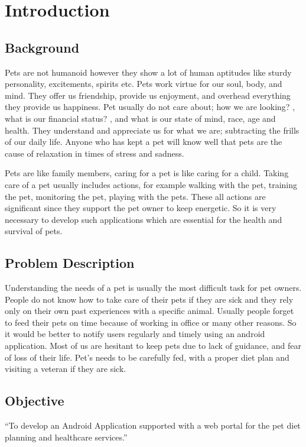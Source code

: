 \chapter{Introduction} \label{chap:intro}


\section{Background}
Pets are not humanoid however they show a lot of human aptitudes like sturdy personality, excitements, spirits etc. Pets work virtue for our soul, body, and mind. They offer us friendship, provide us enjoyment, and overhead everything they provide us happiness. Pet usually do not care about; how we are looking? , what is our financial status? , and what is our state of mind, race, age and health.  They understand and appreciate us for what we are; subtracting the frills of our daily life\cite{capsthree}. 
Anyone who has kept a pet will know well that pets are the cause of relaxation in times of stress and sadness. \par Pets are like family members, caring for a pet is like caring for a child. Taking care of a pet usually includes actions, for example walking with the pet, training the pet, monitoring the pet, playing with the pets. These all actions are significant   since they support the pet owner to keep energetic. So it is very necessary to develop such applications which are essential for the health and survival of pets.
\section{Problem Description}
Understanding the needs of a pet is usually the most difficult task for pet owners. People do not know how to take care of their pets if they are sick and they rely only on their own past experiences with a specific animal. Usually people forget to feed their pets on time because of working in office or many other reasons. So it would be better to notify users regularly and timely using an android application. Most of us are hesitant to keep pets due to lack of guidance, and fear of loss of their life.  Pet’s needs to be carefully fed, with a proper diet plan and visiting a veteran if they are sick.
\section{Objective}
“To develop an Android Application supported with a web portal for the pet diet planning and healthcare services.”

